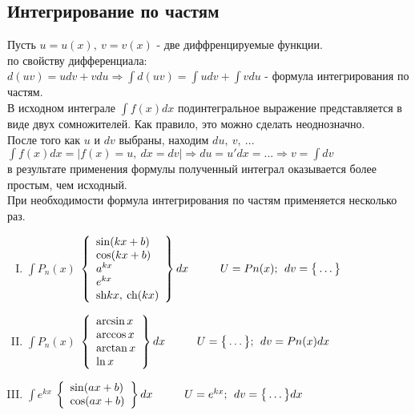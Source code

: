 \documentclass[a4paper,12pt]{bookest}
\theoremstyle{remark}
\newcommand\tab[1][1cm]{\hspace*{#1}}
\begin{document}
\subsection{Интегрирование по частям}
Пусть $u=u(x),\>v=v(x)$ - две диффренцируемые функции. \\
по свойству дифференциала:\\$d(uv)=udv+vdu\Rightarrow\int d(uv)=\int udv+\int vdu$ - формула интегрирования по частям.\\
В исходном интеграле $\int f(x)dx$ подинтегральное выражение представляется в виде двух сомножителей. Как правило, это можно сделать неоднозначно.\\
После того как $u$ и $dv$ выбраны, находим $du,\>v,\>...$\\
$\int f(x)dx = |f(x)=u,\>dx=dv|\Rightarrow du=u'dx=...\Rightarrow v=\int dv$ \\
в результате применения формулы полученный интеграл оказывается более простым, чем исходный.\\
При необходимости формула интегрирования по частям применяется несколько раз.
\begin{enumerate}[I.]
	\item $\int P_n(x)$
		$\left\{\begin{array}{lr}
        \sin(kx+b)\\ \cos(kx+b)\\a^{kx}\\e^{kx}\\\textrm{sh}kx,\>\textrm{ch}(kx)
        \end{array}\right\}dx\tab U=Pn(x);\>\>dv=\big\{\dots\big\}$
        \item $\int P_n(x)$
		$\left\{\begin{array}{lr}
        \arcsin x\\ \arccos x\\\arctan x\\\ln x\\
        \end{array}\right\}dx\tab U=\big\{\dots\big\};\>\>dv=Pn(x)dx$
        \item $\int e^{kx}$
		$\left\{\begin{array}{lr}
        \sin (ax+b)\\ \cos (ax+b)\end{array}\right\}dx\tab U=e^{kx};\>\>dv=\big\{\dots\big\}dx$
\end{enumerate}
\end{document}
